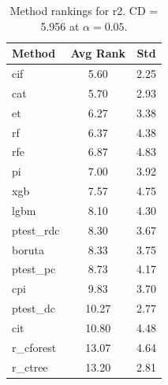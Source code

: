 \begin{table}[h]
\centering
\caption{Method rankings for r2. CD = 5.956 at $\alpha=0.05$.}
\label{tab:ranks_r2}
\begin{tabular}{lcc}
\toprule
Method & Avg Rank & Std \\
\midrule
cif & 5.60 & 2.25 \\
cat & 5.70 & 2.93 \\
et & 6.27 & 3.38 \\
rf & 6.37 & 4.38 \\
rfe & 6.87 & 4.83 \\
pi & 7.00 & 3.92 \\
xgb & 7.57 & 4.75 \\
lgbm & 8.10 & 4.30 \\
ptest_rdc & 8.30 & 3.67 \\
boruta & 8.33 & 3.75 \\
ptest_pc & 8.73 & 4.17 \\
cpi & 9.83 & 3.70 \\
ptest_dc & 10.27 & 2.77 \\
cit & 10.80 & 4.48 \\
r_cforest & 13.07 & 4.64 \\
r_ctree & 13.20 & 2.81 \\
\bottomrule
\end{tabular}
\end{table}